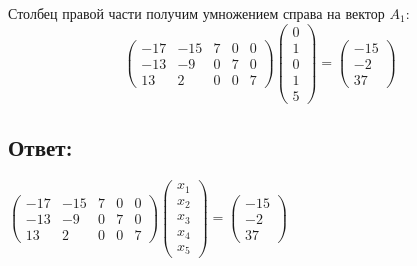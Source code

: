 \documentclass[12pt]{article}
\begin{document}
{    Столбец правой части получим умножением справа на вектор $A_1$:
    \[
        \begin{pmatrix}
            - 17 & - 15 & 7 & 0 & 0 \\
            -13  & - 9  & 0 & 7 & 0 \\
            13   & 2    & 0 & 0 & 7
        \end{pmatrix}
        \begin{pmatrix}
            0 \\ 1 \\ 0 \\ 1 \\ 5
        \end{pmatrix}
        =
        \begin{pmatrix}
            -15 \\
            -2  \\
            37
        \end{pmatrix}
    \]
    }

    \subsection*{Ответ:}
    {\color{blue}
        $
        \begin{pmatrix}
            - 17 & - 15 & 7 & 0 & 0 \\
            -13  & - 9  & 0 & 7 & 0 \\
            13   & 2    & 0 & 0 & 7
        \end{pmatrix}
        \begin{pmatrix}
            x_1 \\ x_2 \\ x_3 \\ x_4 \\ x_5
        \end{pmatrix}
        =
        \begin{pmatrix}
            -15 \\
            -2  \\
            37
        \end{pmatrix}
        $
    }
\end{document}
